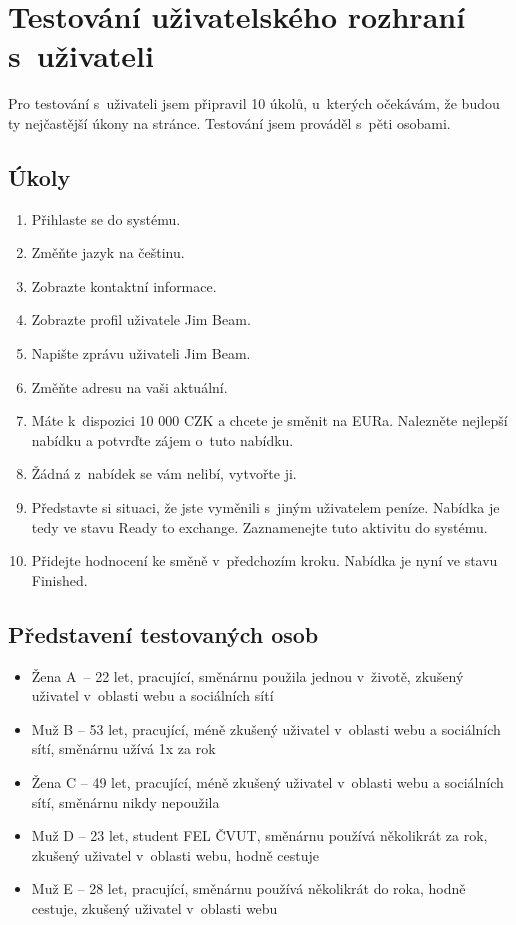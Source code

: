 \section{Testování uživatelského rozhraní s~uživateli}
\label{user-testing}
Pro testování s~uživateli jsem připravil 10 úkolů, u~kterých očekávám, že budou ty nejčastější úkony na stránce. Testování jsem prováděl s~pěti osobami.
\subsection{Úkoly}

\begin{enumerate}
    \item Přihlaste se do systému.
    \item Změňte jazyk na češtinu.
    \item Zobrazte kontaktní informace.
    \item Zobrazte profil uživatele Jim Beam.
    \item Napište zprávu uživateli Jim Beam.
    \item Změňte adresu na vaši aktuální.
    \item Máte k~dispozici 10 000 CZK a chcete je směnit na EURa. Nalezněte nejlepší nabídku a potvrďte zájem o~tuto nabídku.
    \item Žádná z~nabídek se vám nelibí, vytvořte ji.
    \item Představte si situaci, že jste vyměnili s~jiným uživatelem peníze. Nabídka je tedy ve stavu Ready to exchange. Zaznamenejte tuto aktivitu do systému.
    \item Přidejte hodnocení ke směně v~předchozím kroku. Nabídka je nyní ve stavu Finished.
\end{enumerate}

\subsection{Představení testovaných osob}

\begin{itemize}
    \item Žena A~-- 22 let, pracující, směnárnu použila jednou v~životě, zkušený uživatel v~oblasti webu a sociálních sítí
    \item Muž B -- 53 let, pracující, méně zkušený uživatel v~oblasti webu a sociálních sítí, směnárnu užívá 1x za rok
    \item Žena C -- 49 let, pracující, méně zkušený uživatel v~oblasti webu a sociálních sítí, směnárnu nikdy nepoužila
    \item Muž D -- 23 let, student FEL ČVUT, směnárnu používá několikrát za rok, zkušený uživatel v~oblasti webu, hodně cestuje
    \item Muž E -- 28 let, pracující, směnárnu používá několikrát do roka, hodně cestuje, zkušený uživatel v~oblasti webu
\end{itemize}

